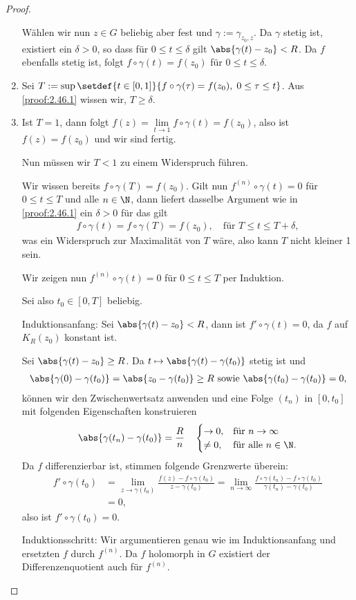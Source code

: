 \begin{proof}
\begin{enumerate}[label=\arabic{*}.)]
  Wählen wir nun $z\in G$ beliebig aber fest und $\gamma:=\gamma_{z_0,z}$. Da
  $\gamma$ stetig ist, existiert ein $\delta > 0$, so dass für $0\le t\le
  \delta$ gilt $\abs{\gamma(t)-z_0}<R$. Da $f$ ebenfalls stetig ist, folgt $f\circ\gamma(t) = f(z_0)$ für $0\le t\le \delta$.
  \item Sei $T:=\sup\setdef{t\in[0,1]}{f\circ\gamma(\tau) = f(z_0),\;
  0\le\tau\le t}$. Aus \ref{proof:2.46.1} wissen wir, $T\ge\delta$.
  \item Ist $T=1$, dann folgt $f(z) = \lim\limits_{t\to 1} f\circ\gamma(t) =
f(z_0)$, also ist $f(z) = f(z_0)$ und wir sind fertig.
    
Nun müssen wir $T<1$ zu einem Widerspruch führen.

Wir wissen bereits $f\circ\gamma(T) = f(z_0)$. Gilt nun $f^{(n)}\circ\gamma(t)
= 0$ für $0\le t\le T$ und alle $n\in\N$, dann liefert dasselbe Argument wie in
\ref{proof:2.46.1} ein $\delta > 0$ für das gilt
\begin{align*}
f\circ\gamma(t) = f\circ\gamma(T) = f(z_0),\quad\text{für } T\le t \le
T+\delta,
\end{align*}
was ein Widerspruch zur Maximalität von $T$ wäre, also kann $T$ nicht kleiner 1
sein.

Wir zeigen nun $f^{(n)}\circ\gamma(t)
= 0$ für $0\le t\le T$ per Induktion.

Sei also $t_0\in[0,T]$ beliebig.

Induktionsanfang:
Sei $\abs{\gamma(t)-z_0} < R$, dann ist
$f'\circ\gamma(t) = 0$, da $f$ auf $K_R(z_0)$ konstant ist.

Sei $\abs{\gamma(t)-z_0}\ge R$. Da $t\mapsto \abs{\gamma(t)-\gamma(t_0)}$ stetig
ist und
\begin{align*}
\abs{\gamma(0)-\gamma(t_0)} = \abs{z_0-\gamma(t_0)}\ge R \text{ sowie }
\abs{\gamma(t_0)-\gamma(t_0)} = 0,
\end{align*}
können wir den Zwischenwertsatz anwenden und eine Folge $(t_n)$ in
$[0,t_0]$ mit folgenden Eigenschaften konstruieren 
  \begin{align*}
  \abs{\gamma(t_n)-\gamma(t_0)} = \frac{R}{n}\quad
  \begin{cases}
  \to 0, & \text{für } n\to \infty\\
  \neq 0, & \text{für alle } n\in\N.
  \end{cases}
  \end{align*}
Da $f$ differenzierbar ist, stimmen folgende Grenzwerte überein:
\begin{align*}
f'\circ\gamma(t_0) &= \lim\limits_{z\to\gamma(t_0)}
\frac{f(z)-f\circ\gamma(t_0)}{z-\gamma(t_0)}
= \lim\limits_{n\to\infty}
\frac{f\circ\gamma(t_n)-f\circ\gamma(t_0)}{\gamma(t_n)-\gamma(t_0)} \\ &= 0,
\end{align*}
also ist $f'\circ\gamma(t_0) = 0$.

Induktionsschritt: Wir argumentieren genau wie im Induktionsanfang und
ersetzten $f$ durch $f^{(n)}$. Da $f$ holomorph in $G$ existiert der
Differenzenquotient auch für $f^{(n)}$.\qedhere
\end{enumerate}
\end{proof}

